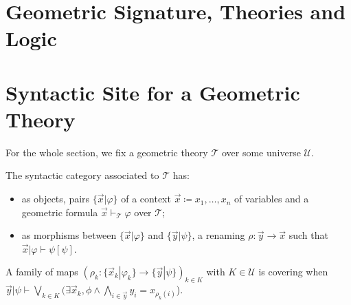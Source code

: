 %

\section{Geometric Signature, Theories and Logic}



\section{Syntactic Site for a Geometric Theory}

\newcommand{\thT}{\ensuremath{\mathcal{T}}}
\newcommand{\fmlInCtx}[2]{\{ #1 | #2 \}}
\newcommand{\subs}[2]{{#1}[{#1}]}
\newcommand{\Univ}{\ensuremath{\mathscr{U}}}
\newcommand{\quot}{\text{quot}}
\newcommand{\vxz}{\vec{x}+\vec{z}}
\newcommand{\iotas}{\ensuremath{[\iota_1,\iota_2]}}

For the whole section, we fix a geometric theory \thT{} over some universe \Univ{}.


\begin{definition}
  \leanok
  The syntactic category associated to $\mathcal{T}$ has:
  \begin{itemize}
    \item as objects, pairs $\fmlInCtx{\vec{x}}{\varphi}$ of a context $\vec{x} \coloneq x_1, \ldots, x_{n}$ of variables and a geometric formula $\vec{x} \vdash_{\thT} \varphi$ over \thT{};
    \item as morphisms between $\fmlInCtx{\vec{x}}{\varphi}$ and $\fmlInCtx{\vec{y}}{\psi}$, a renaming $\rho : \vec{y} \to \vec{x}$ such that $\vec{x} | \varphi \vdash \subs{\psi}{\rho}$.
  \end{itemize}
\end{definition}

\begin{definition}
  \leanok
  A family of maps $(\rho_k : \fmlInCtx{\vec{x}_k}{\varphi_k}\to \fmlInCtx{\vec{y}}{\psi})_{k \in K}$ with $K \in \Univ$ is covering when
  $\vec{y} | \psi \vdash \bigvee_{k \in K} (\exists \vec{x}_k, \phi \wedge \bigwedge_{i \in \vec{y}} y_i = x_{\rho_k(i)}$).
\end{definition}

